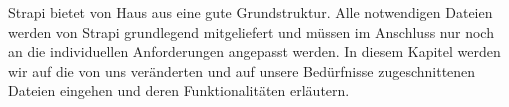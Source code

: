 Strapi bietet von Haus aus eine gute Grundstruktur. Alle notwendigen Dateien werden von Strapi grundlegend mitgeliefert und müssen im Anschluss nur noch an die individuellen Anforderungen angepasst werden. In diesem Kapitel werden wir auf die von uns veränderten und auf unsere Bedürfnisse zugeschnittenen Dateien eingehen und deren Funktionalitäten erläutern.